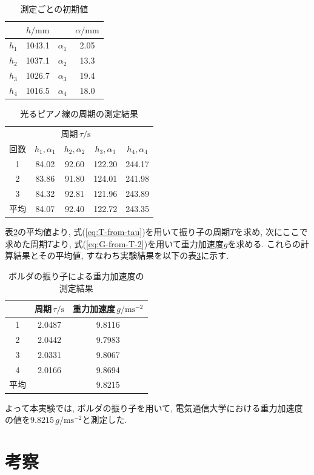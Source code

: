 \documentclass{jarticle}
\begin{document}
\begin{table}[h]
  \centering
  \caption{測定ごとの初期値}
  \begin{tabular}{cc|cc}
    \hline
    & $h/\mathrm{mm}$ & & $\alpha/\mathrm{mm}$ \\
    \hline
    $h_1$ & 1043.1 & $\alpha_1$ & 2.05 \\
    $h_2$ & 1037.1 & $\alpha_2$ & 13.3 \\
    $h_3$ & 1026.7 & $\alpha_3$ & 19.4 \\
    $h_4$ & 1016.5 & $\alpha_4$ & 18.0 \\
    \hline
  \end{tabular}
  \label{tb:initial-value-2}
\end{table}

\begin{table}[h]
  \centering
  \caption{光るピアノ線の周期の測定結果}
  \begin{tabular}{ccccc}
    \hline
     & \multicolumn{3}{c}{周期\,$\tau/\mathrm{s}$} \\
    回数 & $h_1,\alpha_1$ & $h_2,\alpha_2$ & $h_3,\alpha_3$ & $h_4,\alpha_4$ \\
    \hline
    1 & 84.02 & 92.60 & 122.20 & 244.17 \\
    2 & 83.86 & 91.80 & 124.01 & 241.98 \\
    3 & 84.32 & 92.81 & 121.96 & 243.89 \\
    \hline
    平均 & 84.07 & 92.40 & 122.72 & 243.35 \\
    \hline
  \end{tabular}
  \label{tb:measure-result}
\end{table}

表\ref{tb:measure-result}の平均値より, 式(\ref{eq:T-from-tau})を用いて振り子の周期$T$を求め, 次にここで求めた周期$T$より, 式(\ref{eq:G-from-T-2})を用いて重力加速度$g$を求める. これらの計算結果とその平均値, すなわち実験結果を以下の表\ref{tb:experiment-result}に示す. 

\begin{table}[H]
  \centering
  \caption{ボルダの振り子による重力加速度の測定結果}
  \begin{tabular}{ccc}
    \hline
    & 周期\,$\tau/\mathrm{s}$ & 重力加速度\,$g/\mathrm{ms^{-2}}$\\
    \hline
    1 & 2.0487 & 9.8116 \\
    2 & 2.0442 & 9.7983 \\
    3 & 2.0331 & 9.8067 \\
    4 & 2.0166 & 9.8694 \\
    \hline
    平均 & & 9.8215 \\
    \hline
  \end{tabular}
  \label{tb:experiment-result}
\end{table}

よって本実験では, ボルダの振り子を用いて, 電気通信大学における重力加速度の値を$9.8215\,g/\mathrm{ms^{-2}}$と測定した.


\section{考察}
\end{document}
